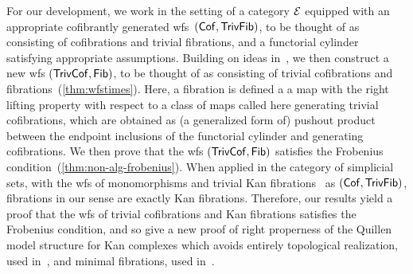 \documentclass[reqno,10pt,a4paper,oneside,draft]{amsart}
\begin{document}
For our development, we work in the setting of a category $\cal{E}$ equipped with an appropriate cofibrantly
generated wfs~$(\Cof, \TrivFib)$, to be thought of as consisting of cofibrations and trivial fibrations, and a functorial cylinder satisfying appropriate assumptions.
Building on ideas in~\cite{cisinski-asterisque}, we then construct a new wfs $(\TrivCof, \Fib)$, to be thought of as consisting of  trivial cofibrations and fibrations~(\cref{thm:wfstimes}). Here, a fibration is defined a a map with the right lifting property with respect to a class of maps called here generating trivial cofibrations, which are obtained as (a generalized form of) pushout product between the endpoint inclusions of the functorial cylinder and generating 
cofibrations.  We then prove that the wfs $(\TrivCof, \Fib)$ satisfies the Frobenius condition~(\cref{thm:non-alg-frobenius}).
When applied in the category of simplicial sets, with the wfs of monomorphisms and trivial Kan fibrations~\cite{quillen-homotopical} as $(\Cof, \TrivFib)$, fibrations in our sense are exactly Kan fibrations.
Therefore, our results yield a proof that the wfs of trivial cofibrations and Kan fibrations satisfies the Frobenius condition, and so give a new proof of right properness of the Quillen model structure for Kan complexes which avoids entirely topological realization, used in~\cite{hovey-model-categories}, and minimal fibrations, used in~\cite{joyal-tierney:simplicial-homotopy-theory}.
\end{document}
